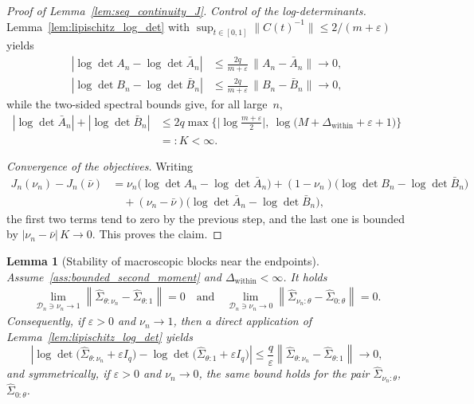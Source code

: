 \documentclass[10pt, letterpaper]{amsart}
\newtheorem{lem}[theorem]{Lemma}
\begin{document}
\begin{proof}[Proof of Lemma~\ref{lem:seq_continuity_J}]
\emph{Control of the log-determinants.} Lemma~\ref{lem:lipischitz_log_det} with
$\sup_{t\in[0,1]}\|C(t)^{-1}\|\leq 2/(m+\varepsilon)$ yields
\begin{align*}
|\log\det A_n-\log\det\bar A_n|
&\leq\frac{2q}{m+\varepsilon}\,\|A_n-\bar A_n\|\longrightarrow0,\\
|\log\det B_n-\log\det\bar B_n|
&\leq\frac{2q}{m+\varepsilon}\,\|B_n-\bar B_n\|\longrightarrow0,
\end{align*}
while the two-sided spectral bounds give, for all large~$n$,
\begin{align*}
|\log\det\bar A_n|+|\log\det\bar B_n|
&\leq 2q\max\Big\{\big|\log\tfrac{m+\varepsilon}{2}\big|,\
\log\big(M+\Delta_{\mathrm{within}}+\varepsilon+1\big)\Big\}\\
&=:K<\infty.
\end{align*}

\emph{Convergence of the objectives.} Writing
\begin{align*}
J_n(\nu_n)-J_n(\bar\nu)
&=\nu_n\big(\log\det A_n-\log\det\bar A_n\big)
+(1-\nu_n)\big(\log\det B_n-\log\det\bar B_n\big)\\
&\quad+(\nu_n-\bar\nu)\big(\log\det\bar A_n-\log\det\bar B_n\big),
\end{align*}
the first two terms tend to zero by the previous step, and the last one is
bounded by $|\nu_n-\bar\nu|\,K\to0$. This proves the claim.

\end{proof}

\begin{lem}[Stability of macroscopic blocks near the endpoints]\label{lem:endpoint_large_block}
  Assume~\ref{ass:bounded_second_moment} and $\Delta_{\mathrm{within}}<\infty$. \newline
  It holds
  \begin{align}
    \lim_{\mathcal D_n \ni \nu_n\to 1} \left\|\widehat\Sigma_{\theta:\nu_n}-\widehat\Sigma_{\theta:1}\right\|  = 0 \quad \mbox{and} \quad     \lim_{\mathcal D_n \ni \nu_n\to 0}  \left\|\widehat\Sigma_{\nu_n:\theta}-\widehat\Sigma_{0:\theta}\right\| = 0.
  \end{align}
Consequently, if $\varepsilon>0$ and $\nu_n\to1$, then a direct application of Lemma~\ref{lem:lipischitz_log_det} yields
\[
\left|
\log\det\big(\widehat\Sigma_{\theta:\nu_n}+\varepsilon I_q\big)
-
\log\det\big(\widehat\Sigma_{\theta:1}+\varepsilon I_q\big)
\right|
\leq
\frac{q}{\varepsilon}
\left\|\widehat\Sigma_{\theta:\nu_n}-\widehat\Sigma_{\theta:1}\right\|
\longrightarrow0,
\]
and symmetrically, if $\varepsilon>0$ and $\nu_n\to0$, the same bound holds for the pair $\widehat\Sigma_{\nu_n:\theta}$, $\widehat\Sigma_{0:\theta}$.
\end{lem}
\end{document}
